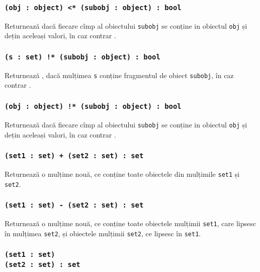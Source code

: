 \subsubsection{\texttt{(obj : object) <* (subobj : object) : bool}}

Returnează \true{} dacă fiecare cîmp al obiectului \texttt{subobj} se conține in obiectul \texttt{obj} și dețin aceleași valori, în caz contrar \false{}.

\subsubsection{\texttt{(s : set) !* (subobj : object) : bool}}

Returnează \false{}, dacă mulțimea \texttt{s} conține fragmentul de obiect \texttt{subobj}, în caz contrar \true{}.

\subsubsection{\texttt{(obj : object) !* (subobj : object) : bool}}

Returnează \false{} dacă fiecare cîmp al obiectului \texttt{subobj} se conține in obiectul \texttt{obj} și dețin aceleași valori, în caz contrar \true{}.

\subsubsection{\texttt{(set1 : set) + (set2 : set) : set}}

Returnează o mulțime nouă, ce conține toate obiectele din mulțimile \texttt{set1} și \texttt{set2}.

\subsubsection{\texttt{(set1 : set) - (set2 : set) : set}}

Returnează o mulțime nouă, ce conține toate obiectele mulțimii \texttt{set1}, care lipsesc în mulțimea \texttt{set2}, și obiectele mulțimii \texttt{set2}, ce lipsesc în \texttt{set1}.

\subsubsection{\texttt{(set1 : set) \\ (set2 : set) : set}}

